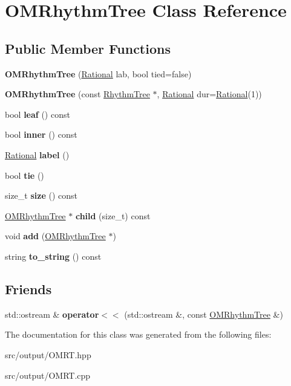 \hypertarget{classOMRhythmTree}{}\section{O\+M\+Rhythm\+Tree Class Reference}
\label{classOMRhythmTree}
\subsection*{Public Member Functions}
\begin{DoxyCompactItemize}
\item 
{\bfseries O\+M\+Rhythm\+Tree} (\mbox{\hyperlink{classRational}{Rational}} lab, bool tied=false)
\item 
{\bfseries O\+M\+Rhythm\+Tree} (const \mbox{\hyperlink{classRhythmTree}{Rhythm\+Tree}} $\ast$, \mbox{\hyperlink{classRational}{Rational}} dur=\mbox{\hyperlink{classRational}{Rational}}(1))
\item 
\mbox{\label{classOMRhythmTree_a04e14eae7285e3f9473823354599ab84}} 
bool {\bfseries leaf} () const
\item 
\mbox{\label{classOMRhythmTree_af820acb008741753d15dbae463a511c5}} 
bool {\bfseries inner} () const
\item 
\mbox{\label{classOMRhythmTree_afdd5d2e8c598012d228d484fef59ea54}} 
\mbox{\hyperlink{classRational}{Rational}} {\bfseries label} ()
\item 
\mbox{\label{classOMRhythmTree_a3af64526e62a8148b5966dc43f7e9f74}} 
bool {\bfseries tie} ()
\item 
size\+\_\+t {\bfseries size} () const
\item 
\mbox{\hyperlink{classOMRhythmTree}{O\+M\+Rhythm\+Tree}} $\ast$ {\bfseries child} (size\+\_\+t) const
\item 
void {\bfseries add} (\mbox{\hyperlink{classOMRhythmTree}{O\+M\+Rhythm\+Tree}} $\ast$)
\item 
string {\bfseries to\+\_\+string} () const
\end{DoxyCompactItemize}
\subsection*{Friends}
\begin{DoxyCompactItemize}
\item 
\mbox{\label{classOMRhythmTree_a256b138eed510909e4d90cfa497eb88a}} 
std\+::ostream \& {\bfseries operator$<$$<$} (std\+::ostream \&, const \mbox{\hyperlink{classOMRhythmTree}{O\+M\+Rhythm\+Tree}} \&)
\end{DoxyCompactItemize}


The documentation for this class was generated from the following files\+:\begin{DoxyCompactItemize}
\item 
src/output/O\+M\+R\+T.\+hpp\item 
src/output/O\+M\+R\+T.\+cpp\end{DoxyCompactItemize}

